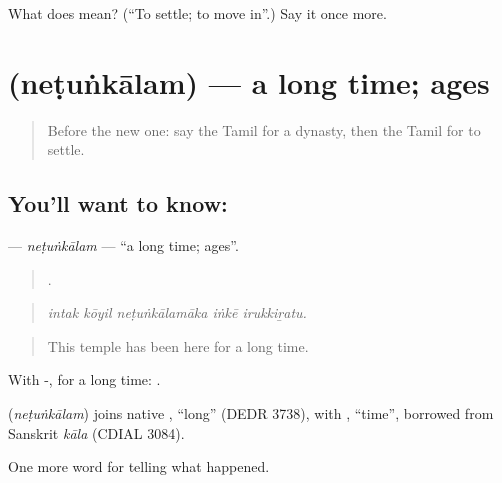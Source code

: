 \begin{tcolorbox}[breakable,colback=teal!4,colframe=teal!35!black,title={Before you move on}]
What does  mean? (\textquotedblleft{}To settle; to move in\textquotedblright{}.) Say it once more.
\end{tcolorbox}
\section[\texorpdfstring{\ta{நெடுங்காலம்} (neṭuṅkālam)}{நெடுங்காலம் (neṭuṅkālam)}]{ (neṭuṅkālam) — a long time; ages}

\label{lesson:TA-C327-netunkalam}



\begin{quote}
Before the new one: say the Tamil for a dynasty, then the Tamil for to settle.
\end{quote}

\subsection*{You'll want to know: }
\textbf{} — \emph{neṭuṅkālam} — \textquotedblleft{}a long time; ages\textquotedblright{}.

\begin{quote}
    .
\end{quote}

\begin{quote}
\emph{intak kōyil neṭuṅkālamāka iṅkē irukkiṟatu.}
\end{quote}

\begin{quote}
This temple has been here for a long time.
\end{quote}

With -, for a long time: .

\begin{cousinweb}
\textbf{} (\emph{neṭuṅkālam}) joins native , \textquotedblleft{}long\textquotedblright{} (DEDR 3738), with , \textquotedblleft{}time\textquotedblright{}, borrowed from Sanskrit \emph{kāla} (CDIAL 3084).
\end{cousinweb}

\begin{grammarlens}[title={What you've built}]
One more word for telling what happened.
\end{grammarlens}

